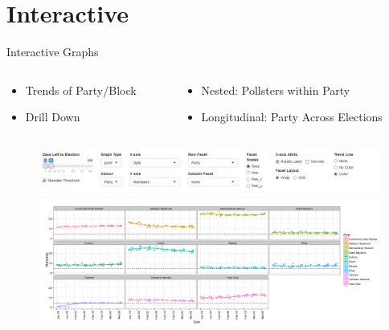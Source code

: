 \documentclass[11pt]{beamer}
\begin{document}
\section{Interactive}
\begin{frame}{Interactive Graphs}
\begin{columns}
\begin{column}{.4\linewidth}
\begin{itemize}
\item Trends of Party/Block
\item Drill Down
\end{itemize}
\end{column}
\begin{column}{.6\linewidth}
\begin{itemize}
\item Nested: Pollsters within Party
\item Longitudinal: Party Across Elections
\end{itemize}
\end{column}
\end{columns}



				\begin{figure}[h]
					\centering
					\includegraphics[width=.85\linewidth]{../www/pad_screen_grab}
					\label{fig:pad_screen_grab}
				\end{figure}

\end{frame}
\end{document}
